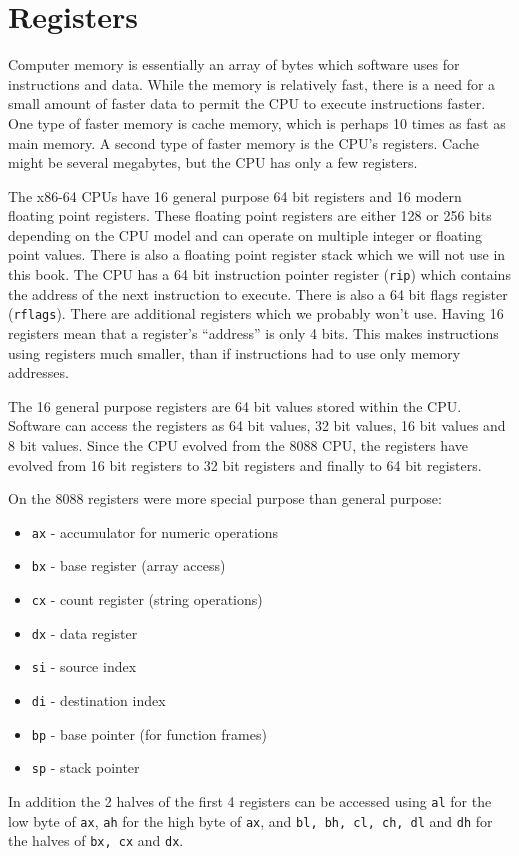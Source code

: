 \documentclass[11pt,b5paper]{book}
\begin{document}
\chapter{Registers}

Computer memory is essentially an array of bytes
which software uses for instructions and data.
While the memory is relatively fast, there is a need for a small amount of
faster data to permit the CPU to execute instructions faster.
One type of faster memory is cache memory, which is perhaps 10 times as fast 
as main memory.
A second type of faster memory is the CPU's registers. 
Cache might be several megabytes, but the CPU has only a few registers.

The x86-64 CPUs have 16 general purpose 64 bit registers and 16 modern
floating point registers.
These floating point registers are either 128 or 256 bits depending on the
CPU model and can operate on multiple integer or floating point values.
There is also a floating point register stack which we will not use in this book.
The CPU has a 64 bit instruction pointer register ({\tt rip}) which contains 
the address of the next instruction to execute.
There is also a 64 bit flags register ({\tt rflags}).  
There are additional registers which we probably won't use.
Having 16 registers mean that a register's ``address'' is only 4 bits.
This makes instructions using registers much smaller, than if instructions
had to use only memory addresses.

The 16 general purpose registers are 64 bit values stored within the CPU.  Software can
access the registers as 64 bit values, 32 bit values, 16 bit values and 8 bit
values.  Since the CPU evolved from the 8088 CPU, the registers have evolved
from 16 bit registers to 32 bit registers and finally to 64 bit registers.

On the 8088 registers were more special purpose than general purpose:
\begin{itemize}
\item {\tt ax} - accumulator for numeric operations
\item {\tt bx} - base register (array access)
\item {\tt cx} - count register (string operations)
\item {\tt dx} - data register
\item {\tt si} - source index
\item {\tt di} - destination index
\item {\tt bp} - base pointer (for function frames)
\item {\tt sp} - stack pointer
\end{itemize}
In addition the 2 halves of the first 4 registers can be accessed using
{\tt al} for the low byte of {\tt ax}, {\tt ah} for the high byte of {\tt ax},
and {\tt bl, bh, cl, ch, dl} and {\tt dh} for the halves of {\tt bx, cx} and {\tt dx}.
\end{document}
